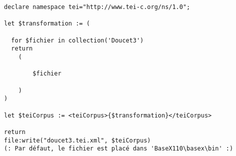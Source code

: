 \begin{verbatim}
declare namespace tei="http://www.tei-c.org/ns/1.0";

let $transformation := (

  for $fichier in collection('Doucet3')
  return
    (
      
        $fichier  
      
    )
)

let $teiCorpus := <teiCorpus>{$transformation}</teiCorpus>

return
file:write("doucet3.tei.xml", $teiCorpus)
(: Par défaut, le fichier est placé dans 'BaseX110\basex\bin' :)
\end{verbatim}